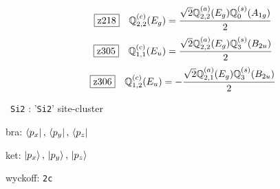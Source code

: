 \documentclass[fleqn,10pt,landscape]{jsarticle}
\begin{document}
\begin{dmath*}
\hspace*{3mm}\fbox{z218}\quad \mathbb{Q}_{2,2}^{(c)}(E_{g})=\frac{\sqrt{2} \mathbb{Q}_{2,2}^{(a)}(E_{g}) \mathbb{Q}_{0}^{(s)}(A_{1g})}{2}
\end{dmath*}
\begin{dmath*}
\hspace*{3mm}\fbox{z305}\quad \mathbb{Q}_{1,1}^{(c)}(E_{u})=\frac{\sqrt{2} \mathbb{Q}_{2,2}^{(a)}(E_{g}) \mathbb{Q}_{3}^{(s)}(B_{2u})}{2}
\end{dmath*}
\begin{dmath*}
\hspace*{3mm}\fbox{z306}\quad \mathbb{Q}_{1,2}^{(c)}(E_{u})=- \frac{\sqrt{2} \mathbb{Q}_{2,1}^{(a)}(E_{g}) \mathbb{Q}_{3}^{(s)}(B_{2u})}{2}
\end{dmath*}
\vspace{5mm}

\noindent\textbullet\, \texttt{Si2} : '\texttt{Si2}' site-cluster

\noindent\quad * bra: $\bra{p_{x}},\, \bra{p_{y}},\, \bra{p_{z}}$

\noindent\quad * ket: $\ket{p_{x}},\, \ket{p_{y}},\, \ket{p_{z}}$

\noindent\quad * wyckoff: \texttt{2c}
\end{document}
